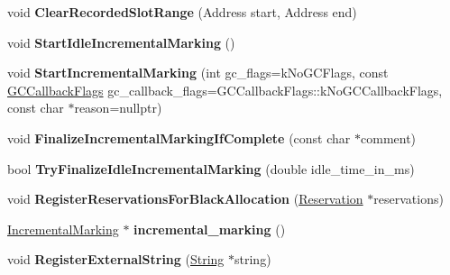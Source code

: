 \begin{DoxyCompactItemize}
\item 
void {\bfseries Clear\+Recorded\+Slot\+Range} (Address start, Address end)\hypertarget{classv8_1_1internal_1_1_heap_a1f8f30732064e29aad0b9e9175998a81}{}\label{classv8_1_1internal_1_1_heap_a1f8f30732064e29aad0b9e9175998a81}

\item 
void {\bfseries Start\+Idle\+Incremental\+Marking} ()\hypertarget{classv8_1_1internal_1_1_heap_a2ff5844e544742360608ff235a3bb8cc}{}\label{classv8_1_1internal_1_1_heap_a2ff5844e544742360608ff235a3bb8cc}

\item 
void {\bfseries Start\+Incremental\+Marking} (int gc\+\_\+flags=k\+No\+G\+C\+Flags, const \hyperlink{namespacev8_a247c37a849f4d6c293b9b16e94e1944b}{G\+C\+Callback\+Flags} gc\+\_\+callback\+\_\+flags=G\+C\+Callback\+Flags\+::k\+No\+G\+C\+Callback\+Flags, const char $\ast$reason=nullptr)\hypertarget{classv8_1_1internal_1_1_heap_a88ab4d338e1f1e9fca5a7ba4b90ee7c6}{}\label{classv8_1_1internal_1_1_heap_a88ab4d338e1f1e9fca5a7ba4b90ee7c6}

\item 
void {\bfseries Finalize\+Incremental\+Marking\+If\+Complete} (const char $\ast$comment)\hypertarget{classv8_1_1internal_1_1_heap_a335a5625a3349cab4532fab5d53eb3ef}{}\label{classv8_1_1internal_1_1_heap_a335a5625a3349cab4532fab5d53eb3ef}

\item 
bool {\bfseries Try\+Finalize\+Idle\+Incremental\+Marking} (double idle\+\_\+time\+\_\+in\+\_\+ms)\hypertarget{classv8_1_1internal_1_1_heap_aa559341929e33e1047f70ebed6a74393}{}\label{classv8_1_1internal_1_1_heap_aa559341929e33e1047f70ebed6a74393}

\item 
void {\bfseries Register\+Reservations\+For\+Black\+Allocation} (\hyperlink{classv8_1_1internal_1_1_list}{Reservation} $\ast$reservations)\hypertarget{classv8_1_1internal_1_1_heap_ad1a7c5fe3c41a91e31a4a5f7051e26c9}{}\label{classv8_1_1internal_1_1_heap_ad1a7c5fe3c41a91e31a4a5f7051e26c9}

\item 
\hyperlink{classv8_1_1internal_1_1_incremental_marking}{Incremental\+Marking} $\ast$ {\bfseries incremental\+\_\+marking} ()\hypertarget{classv8_1_1internal_1_1_heap_ab22cdb999c73da6215619ad67bbd13d4}{}\label{classv8_1_1internal_1_1_heap_ab22cdb999c73da6215619ad67bbd13d4}

\item 
void {\bfseries Register\+External\+String} (\hyperlink{classv8_1_1internal_1_1_string}{String} $\ast$string)\hypertarget{classv8_1_1internal_1_1_heap_aebf4049cfea0524fafb022d656f25467}{}\label{classv8_1_1internal_1_1_heap_aebf4049cfea0524fafb022d656f25467}


\end{DoxyCompactItemize}
